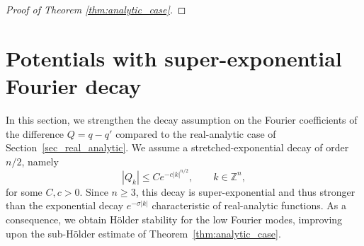 \documentclass[a4paper, 11pt, twoside, notitlepage]{amsart}
\theoremstyle{definition}
\theoremstyle{remark}
\newcommand{\f}[1]{\footnote{\textcolor{blue}{#1}}}
\newcommand {\p} {\partial}
\begin{document}
\begin{proof}[Proof of Theorem \ref{thm:analytic_case}]

\end{proof}


\section{Potentials with super-exponential Fourier decay}\label{sec_super_exponential}

In this section, we strengthen the decay assumption on the Fourier coefficients of the difference $Q = q - q'$ compared to the real-analytic case of Section~\ref{sec_real_analytic}. We assume a stretched-exponential decay of order $n/2$, namely
\begin{equation}\label{eq:stretched_decay}
|Q_k| \leq C e^{-c |k|^{n/2}}, \qquad k \in \mathbb{Z}^n,
\end{equation}
for some $C, c > 0$. Since $n \geq 3$, this decay is super-exponential and thus stronger than the exponential decay $e^{-\sigma |k|}$ characteristic of real-analytic functions. As a consequence, we obtain H\"older stability for the low Fourier modes, improving upon the sub-H\"older estimate of Theorem~\ref{thm:analytic_case}.
\end{document}
